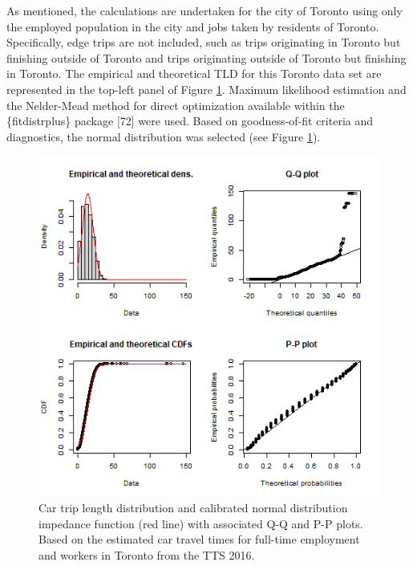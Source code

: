 \documentclass[10pt,letterpaper]{article}
\begin{document}
As mentioned, the calculations are undertaken for the city of Toronto
using only the employed population in the city and jobs taken by
residents of Toronto. Specifically, edge trips are not included, such as
trips originating in Toronto but finishing outside of Toronto and trips
originating outside of Toronto but finishing in Toronto. The empirical
and theoretical TLD for this Toronto data set are represented in the
top-left panel of Figure \ref{fig:TLD-norm-plot}. Maximum likelihood
estimation and the Nelder-Mead method for direct optimization available
within the \{fitdistrplus\} package {[}72{]} were used. Based on
goodness-of-fit criteria and diagnostics, the normal distribution was
selected (see Figure \ref{fig:TLD-norm-plot}).

\begin{figure}

{\centering \includegraphics[width=1\linewidth]{images/impedance_function} 

}

\caption{\label{fig:TLD-norm-plot}Car trip length distribution and calibrated normal distribution impedance function (red line) with associated Q-Q and P-P plots. Based on the estimated car travel times for full-time employment and workers in Toronto from the TTS 2016.}\label{fig:TLD-norm-plot}
\end{figure}
\end{document}
